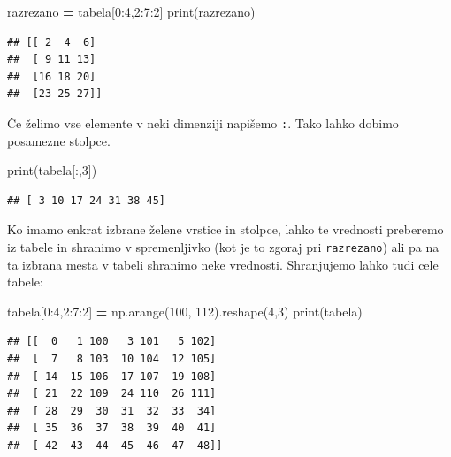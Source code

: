 \documentclass[
]{report}
\newenvironment{Shaded}{\begin{snugshade}}{\end{snugshade}}
\newcommand{\BuiltInTok}[1]{#1}
\newcommand{\DecValTok}[1]{\textcolor[rgb]{0.00,0.00,0.81}{#1}}
\newcommand{\NormalTok}[1]{#1}
\newcommand{\OperatorTok}[1]{\textcolor[rgb]{0.81,0.36,0.00}{\textbf{#1}}}
\begin{document}
\begin{Shaded}
\begin{Highlighting}[]
\NormalTok{razrezano }\OperatorTok{=}\NormalTok{ tabela[}\DecValTok{0}\NormalTok{:}\DecValTok{4}\NormalTok{,}\DecValTok{2}\NormalTok{:}\DecValTok{7}\NormalTok{:}\DecValTok{2}\NormalTok{]}
\BuiltInTok{print}\NormalTok{(razrezano)}
\end{Highlighting}
\end{Shaded}

\begin{verbatim}
## [[ 2  4  6]
##  [ 9 11 13]
##  [16 18 20]
##  [23 25 27]]
\end{verbatim}

Če želimo vse elemente v neki dimenziji napišemo \texttt{:}. Tako lahko dobimo posamezne stolpce.

\begin{Shaded}
\begin{Highlighting}[]
\BuiltInTok{print}\NormalTok{(tabela[:,}\DecValTok{3}\NormalTok{])}
\end{Highlighting}
\end{Shaded}

\begin{verbatim}
## [ 3 10 17 24 31 38 45]
\end{verbatim}

Ko imamo enkrat izbrane želene vrstice in stolpce, lahko te vrednosti preberemo iz tabele in shranimo v spremenljivko (kot je to zgoraj pri \texttt{razrezano}) ali pa na ta izbrana mesta v tabeli shranimo neke vrednosti. Shranjujemo lahko tudi cele tabele:

\begin{Shaded}
\begin{Highlighting}[]
\NormalTok{tabela[}\DecValTok{0}\NormalTok{:}\DecValTok{4}\NormalTok{,}\DecValTok{2}\NormalTok{:}\DecValTok{7}\NormalTok{:}\DecValTok{2}\NormalTok{] }\OperatorTok{=}\NormalTok{ np.arange(}\DecValTok{100}\NormalTok{, }\DecValTok{112}\NormalTok{).reshape(}\DecValTok{4}\NormalTok{,}\DecValTok{3}\NormalTok{)}
\BuiltInTok{print}\NormalTok{(tabela)}
\end{Highlighting}
\end{Shaded}

\begin{verbatim}
## [[  0   1 100   3 101   5 102]
##  [  7   8 103  10 104  12 105]
##  [ 14  15 106  17 107  19 108]
##  [ 21  22 109  24 110  26 111]
##  [ 28  29  30  31  32  33  34]
##  [ 35  36  37  38  39  40  41]
##  [ 42  43  44  45  46  47  48]]
\end{verbatim}
\end{document}
